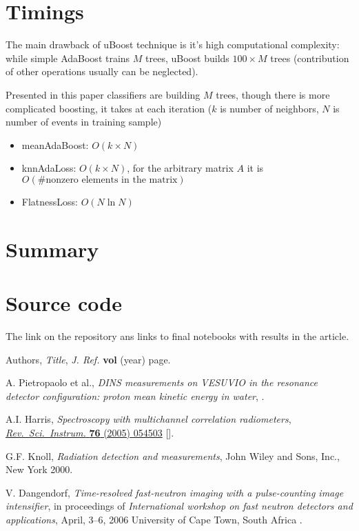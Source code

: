 \documentclass{JINST}
\theoremstyle{definition}
\theoremstyle{remark}
\begin{document}
\section{Timings}

The main drawback of uBoost technique is it's high computational complexity: 
while simple AdaBoost trains $M$ trees, uBoost builds $100 \times M$ trees (contribution of other operations usually can be neglected). 

Presented in this paper classifiers are building $M$ trees, though there is more complicated boosting, it takes at each iteration ($k$ is number of neighbors, $N$ is number of events in training sample)

\begin{itemize}
	\item meanAdaBoost: $O(k \times N)$
	\item knnAdaLoss: $O(k \times N)$, for the arbitrary matrix $A$ it is 
	$O( \text{\#nonzero elements in the matrix})$
	\item FlatnessLoss: $O(N \ln N)$
\end{itemize}


\section{Summary}

\section{Source code}

The link on the repository ans links to final notebooks with results in the article.

\acknowledgments



\begin{thebibliography}{9}

Authors,
\emph{Title},
\emph{J. Ref.} \textbf{vol} (year) page.

A. Pietropaolo et al., \emph{DINS measurements on VESUVIO in the
    resonance detector configuration: proton mean kinetic energy in
    water}, .

A.I. Harris,
\emph{Spectroscopy with multichannel correlation radiometers},
\href{http://dx.doi.org/10.1063/1.1898643}
{\emph{Rev.\ Sci.\ Instrum.} {\bf 76} (2005) 054503}
[].

G.F. Knoll, \emph{Radiation detection and measurements}, John Wiley
    and Sons, Inc., New York 2000.

V. Dangendorf, \emph{Time-resolved fast-neutron imaging with a
pulse-counting image intensifier}, in proceedings of
\emph{International workshop on fast neutron detectors and
applications}, April, 3--6, 2006 University of Cape Town, South Africa
.

\end{thebibliography}
\end{document}
